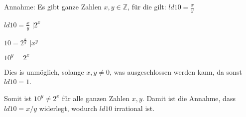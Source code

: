 \documentclass[main.tex]{subfiles}
\begin{document}
\begin{enumerate}
\begin{enumerate}
				Annahme: Es gibt ganze Zahlen \( x,y \in \mathbb{Z} \), für die gilt:
				\( ld 10 = \frac{x}{y} \)

				\( ld 10 = \frac{x}{y} \) \( | 2^x \)

				\( 10 = 2^\frac{x}{y} \) \( | x^y \)

				\( 10^y = 2^x \)

				Dies is unmöglich, solange \( x, y \neq 0 \), was ausgeschlossen werden kann, da sonst
				\( ld 10 = 1 \).

				Somit ist \( 10^y \neq 2^x \) für alle ganzen Zahlen \( x,y \). Damit ist die
				Annahme, dass \( ld 10 =  x / y  \) widerlegt, wodurch \( ld 10  \) irrational ist.
	      \end{enumerate}
\end{enumerate}
\end{document}
